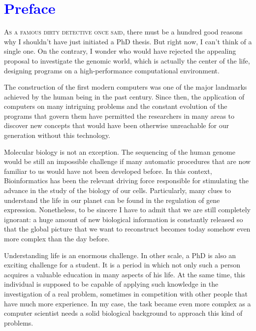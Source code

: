 \chapter*{\textcolor{blue}{\textbf{P}reface}}

\lettrine[lines=4,loversize=-0.1,lraise=0.1,lhang=.2]{A}{s a famous dirty detective once said}, 
there must be a hundred good reasons why I shouldn't have just initiated a PhD thesis. But 
right now, I can't think of a single one. On the contrary, I wonder who would have rejected 
the appealing proposal to investigate the genomic world, which is actually the center of the life, 
designing programs on a high-performance computational environment. 

The construction of the first modern computers was one of the major landmarks achieved by 
the human being in the past century. Since then, the application of computers on many 
intriguing problems and the constant evolution of the programs that govern them have permitted 
the researchers in many areas to discover new concepts that would have been otherwise 
unreachable for our generation without this technology.

Molecular biology is not an exception. The sequencing of the human genome would be still 
an impossible challenge if many automatic procedures that are now familiar to us would 
have not been developed before. In this context, Bioinformatics has been the relevant driving 
force responsible for stimulating the advance in the study of the biology of our cells.
Particularly, many clues to understand the life in our planet can be found in the regulation 
of gene expression. Nonetheless, to be sincere I have to admit that we are still completely 
ignorant: a huge amount of new biological information is constantly released so that the global 
picture that we want to reconstruct becomes today somehow even more complex than the day before.

Understanding life is an enormous challenge. In other scale, a PhD is also an exciting challenge 
for a student. It is a period in which not only such a person acquires a valuable education 
in many aspects of his life. At the same time, this individual is supposed to be capable
of applying such knowledge in the investigation of a real problem, sometimes in competition 
with other people that have much more experience. In my case, the task became even more complex
as a computer scientist needs a solid biological background to approach this kind of problems.


